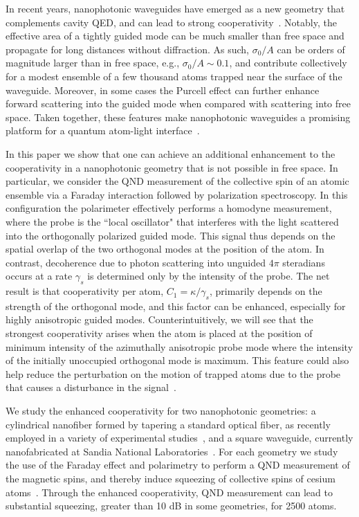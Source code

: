 \documentclass[preprint,aps,pra,onecolumn,superscriptaddress]{revtex4-1} %
\begin{document}
In recent years, nanophotonic waveguides have emerged as a new geometry that complements cavity QED, and can lead to strong cooperativity~\cite{Yu2014,Hung2013,Goban2014,Goban2012,Sayrin2015,Sayrin2015a}.  Notably, the effective area of a tightly guided mode can be much smaller than free space and propagate for long distances without diffraction.  As such,  $\sigma_0/A$ can be orders of magnitude larger than in free space, e.g., $\sigma_0/A \sim 0.1$, and contribute collectively for a modest ensemble of a few thousand atoms trapped near the surface of the waveguide.  Moreover, in some cases the Purcell effect can further enhance forward scattering into the guided mode when compared with scattering into free space.  Taken together, these features make  nanophotonic waveguides a promising platform for a quantum atom-light interface~\cite{Douglas2015,Chang2013,Asenjo-Garcia2017Exponential,Vetsch2010Optical,Dawkins2011,Qi2016}.
 
In this paper we show that one can achieve an additional enhancement to the cooperativity in a nanophotonic geometry that is not possible in free space. In particular, we consider the QND measurement of the collective spin of an atomic ensemble via a Faraday interaction followed by polarization spectroscopy.  In this configuration the polarimeter effectively performs a homodyne measurement, where the probe is the ``local oscillator" that interferes with the light scattered into the orthogonally polarized guided mode.   This signal thus depends on the spatial overlap of the two orthogonal modes at the position of the atom.  In contrast, decoherence due to photon scattering into unguided $4 \pi$ steradians occurs at a rate $\gamma_s$ is determined only by the intensity of the probe.   The net result is that cooperativity per atom, $C_1 = \kappa/\gamma_s$, primarily depends on the strength of the orthogonal mode, and this factor can be enhanced, especially for highly anisotropic guided modes.  Counterintuitively, we will see that the strongest cooperativity arises when the atom is placed at the position of  minimum intensity of the azimuthally anisotropic probe mode where the intensity of the initially unoccupied orthogonal mode is maximum. This feature could also help reduce the perturbation on the motion of trapped atoms due to the probe that causes a disturbance in the signal~\cite{Solano2017Dynamics}.  

We study the enhanced cooperativity for two nanophotonic geometries: a cylindrical nanofiber formed by tapering a standard optical fiber, as recently employed in a variety of experimental studies~\cite{Nayak2008,Vetsch2010Optical,Vetsch2010Opticala,OShea2013,Goban2014,Grover2015,Lee2015,Beguin2014}, and a square waveguide, currently nanofabricated at Sandia National Laboratories~\cite{Jau2016Development,Lee2017Characterizations,Lee2013}.  For each geometry we study the use of the Faraday effect and polarimetry to perform a QND measurement of the magnetic spins, and thereby induce squeezing of collective spins of cesium atoms~\cite{Takahashi1999Quantum,Kuzmich1999,Kuzmich2000,Deutsch2010a,Smith2003a}.  Through the enhanced cooperativity, QND measurement can lead to substantial squeezing, greater than 10 dB in some geometries, for 2500 atoms.
\end{document}
